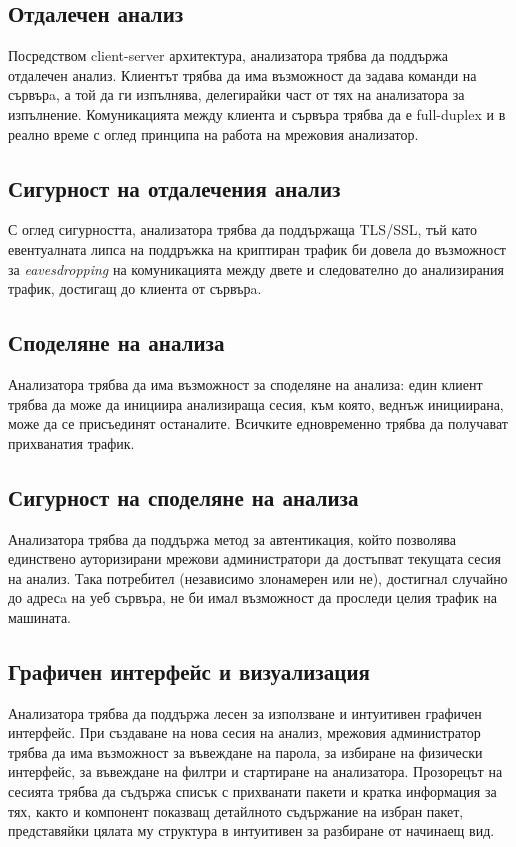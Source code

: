 \documentclass[12pt,a4paper,oneside]{book}
\begin{document}
\subsection{Отдалечен анализ}

Посредством client-server архитектура, анализатора трябва да поддържа отдалечен
анализ. Клиентът трябва да има възможност да задава команди на сървърa, а той
да ги изпълнява, делегирайки част от тях на анализатора за изпълнение.
Комуникацията между клиента и сървъра трябва да е full-duplex и в реално време с
оглед принципа на работа на мрежовия анализатор.

\subsection{Сигурност на отдалечения анализ}

С оглед сигурността, анализатора трябва да поддържаща TLS/SSL, тъй като
евентуалната липса на поддръжка на криптиран трафик би довела до възможност за
\textit{eavesdropping} на комуникацията между двете и следователно до
анализирания трафик, достигащ до клиента от сървърa.

\subsection{Споделяне на анализа}

Анализатора трябва да има възможност за споделяне на анализа: един
клиент трябва да може да инициира анализираща сесия, към която, веднъж инициирана,
може да се присъединят останалите. Всичките едновременно трябва да получават
прихванатия трафик.

\subsection{Сигурност на споделяне на анализа}

Анализатора трябва да поддържа метод за автентикация, който позволява единствено
ауторизирани мрежови администратори да достъпват текущата сесия на
анализ. Така потребител (независимо злонамерен или не), достигнал случайно до
адресa на уеб сървъра, не би имал възможност да проследи целия трафик на
машината.

\subsection{Графичен интерфейс и визуализация}

Анализатора трябва да поддържа лесен за използване и интуитивен графичен
интерфейс. При създаване на нова сесия на анализ, мрежовия администратор трябва
да има възможност за въвеждане на парола, за избиране на физически интерфейс, за
въвеждане на филтри и стартиране на анализатора. Прозорецът на сесията трябва да
съдържа списък с прихванати пакети и кратка информация за тях, както и
компонент показващ детайлното съдържание на избран пакет, представяйки цялата му
структура в интуитивен за разбиране от начинаещ вид.
\end{document}
